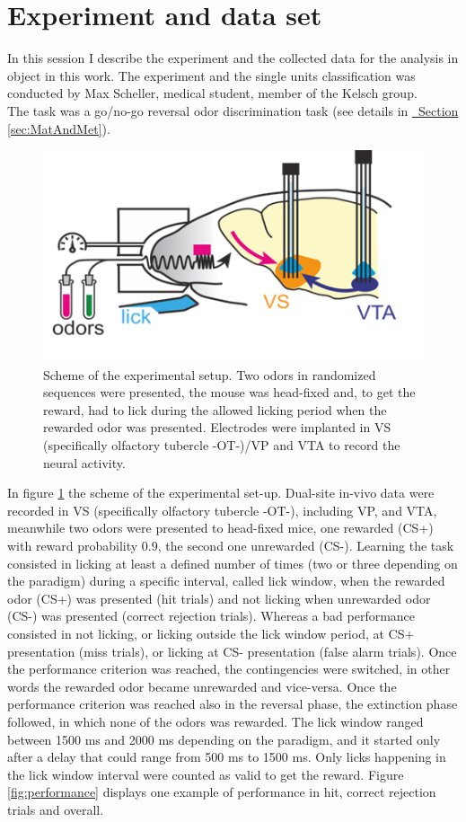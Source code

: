 \section{Experiment and data set}
\label{sec:Dataset}
\begin{framed}
In this session I describe the experiment and the collected data for the analysis in object in this work. The experiment and the single units classification was conducted by Max Scheller, medical student, member of the Kelsch group.\\The task was a go/no-go reversal odor discrimination task (see details in \hyperref[sec:MatAndMet]{~Section \ref*{sec:MatAndMet}}).
\begin{figure}[H]
    \centering
    \includegraphics[scale=0.92]{figures/Experiment.png}
    \caption{Scheme of the experimental setup. Two odors in randomized sequences were presented, the mouse was head-fixed and, to get the reward, had to lick during the allowed licking period when the rewarded odor was presented. Electrodes were implanted in VS (specifically olfactory tubercle -OT-)/VP  and VTA to record the neural activity.}
    \label{fig:experiment}
\end{figure}
In figure \ref{fig:experiment} the scheme of the experimental set-up. Dual-site in-vivo data were recorded in VS (specifically olfactory tubercle -OT-), including VP, and VTA, meanwhile two odors were presented to head-fixed mice, one rewarded (CS+) with reward probability 0.9, the second one unrewarded (CS-). Learning the task consisted in licking at least a defined number of times (two or three depending on the paradigm) during a specific interval, called lick window, when the rewarded odor (CS+) was presented (hit trials) and not licking when unrewarded odor (CS-) was presented (correct rejection trials). Whereas a bad performance consisted in not licking, or licking outside the lick window period, at CS+ presentation (miss trials), or licking at CS- presentation (false alarm trials). Once the performance criterion was reached, the contingencies were switched, in other words the rewarded odor became unrewarded and vice-versa. Once the performance criterion was reached also in the reversal phase, the extinction phase followed, in which none of the odors was rewarded. The lick window ranged between 1500 ms and 2000 ms depending on the paradigm, and it started only after a delay that could range from 500 ms to 1500 ms. Only licks happening in the lick window interval were counted as valid to get the reward. Figure \ref{fig:performance} displays one example of performance in hit, correct rejection trials and overall.

\end{framed}
